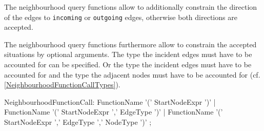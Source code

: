 The neighbourhood query functions allow to additionally constrain the direction of the edges to \texttt{incoming} or \texttt{outgoing} edges, otherwise both directions are accepted.

The neighbourhood query functions furthermore allow to constrain the accepted situations by optional arguments. The type the incident edges must have to be accounted for can be specified. Or the type the incident edges must have to be accounted for and the type the adjacent nodes must have to be accounted for (cf. \ref{NeighbourhoodFunctionCallTypes}).

\begin{rail}
NeighbourhoodFunctionCall: 
  FunctionName '(' StartNodeExpr ')' |
  FunctionName '(' StartNodeExpr ',' EdgeType ')' |
  FunctionName '(' StartNodeExpr ',' EdgeType ',' NodeType ')'
  ;
\end{rail}\label{NeighbourhoodFunctionCallTypes}

